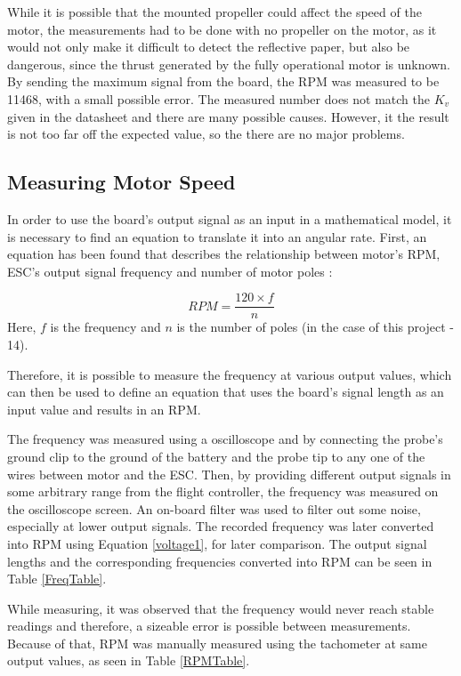 While it is possible that the mounted propeller could affect the speed of the motor, the measurements had to be done with no propeller on the motor, as it would not only make it difficult to detect the reflective paper, but also be dangerous, since the thrust generated by the fully operational motor is unknown.
By sending the maximum signal from the board, the RPM was measured to be 11468, with a small possible error. The measured number does not match the $K_v$ given in the datasheet and there are many possible causes. However, it the result is not too far off the expected value, so the there are no major problems.

\subsection{Measuring Motor Speed}
In order to use the board's output signal as an input in a mathematical model, it is necessary to find an equation to translate it into an angular rate.
First, an equation has been found that describes the relationship between motor's RPM, ESC's output signal frequency and number of motor poles \cite{RPMEq}:

\begin{equation}
\label{voltage1}
	RPM = \frac{120\times f}{n}
\end{equation}
Here, $f$ is the frequency and $n$ is the number of poles (in the case of this project - 14).

Therefore, it is possible to measure the frequency at various output values, which can then be used to define an equation that uses the board's signal length as an input value and results in an RPM.

The frequency was measured using a oscilloscope and by connecting the probe's ground clip to the ground of the battery and the probe tip to any one of the wires between motor and the ESC. Then, by providing different output signals in some arbitrary range from the flight controller, the frequency was measured on the oscilloscope screen. An on-board filter was used to filter out some noise, especially at lower output signals. The recorded frequency was later converted into RPM using Equation \ref{voltage1}, for later comparison. The output signal lengths and the corresponding frequencies converted into RPM can be seen in Table \ref{FreqTable}.

While measuring, it was observed that the frequency would never reach stable readings and therefore, a sizeable error is possible between measurements. Because of that, RPM was manually measured using the tachometer at same output values, as seen in Table \ref{RPMTable}.

